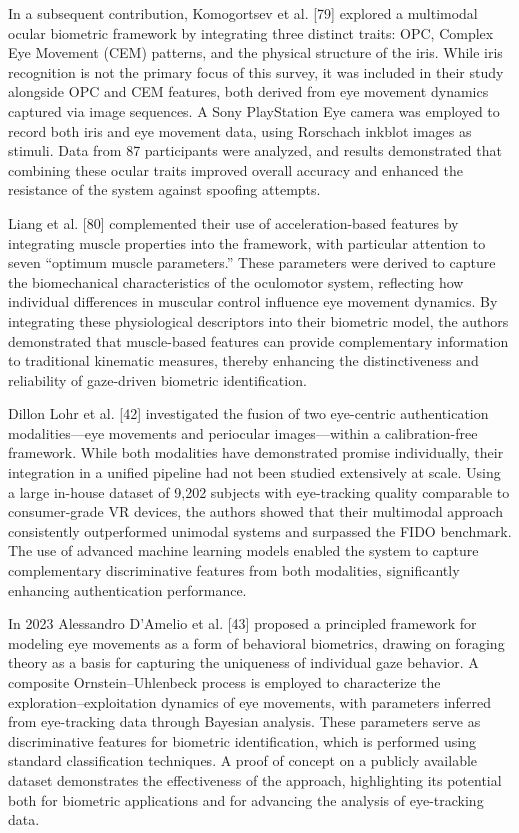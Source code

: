 \documentclass{article}
\begin{document}
In a subsequent contribution, Komogortsev et al. [79] explored a multimodal ocular biometric framework by integrating three distinct traits: OPC, Complex Eye Movement (CEM) patterns, and the physical structure of the iris.
While iris recognition is not the primary focus of this survey, it was included in their study alongside OPC and CEM features, both derived from eye movement dynamics captured via image sequences. 
A Sony PlayStation Eye camera was employed to record both iris and eye movement data, using Rorschach inkblot images as stimuli.
Data from 87 participants were analyzed, and results demonstrated that combining these ocular traits improved overall accuracy and enhanced the resistance of the system against spoofing attempts.

Liang et al. [80] complemented their use of acceleration-based features by integrating muscle properties into the framework, with particular attention to seven “optimum muscle parameters.”
These parameters were derived to capture the biomechanical characteristics of the oculomotor system, reflecting how individual differences in muscular control influence eye movement dynamics.
By integrating these physiological descriptors into their biometric model, the authors demonstrated that muscle-based features can provide complementary information to traditional kinematic measures, thereby enhancing the distinctiveness and reliability of gaze-driven biometric identification.

Dillon Lohr et al. [42] investigated the fusion of two eye-centric authentication modalities—eye movements and periocular images—within a calibration-free framework. 
While both modalities have demonstrated promise individually, their integration in a unified pipeline had not been studied extensively at scale.
Using a large in-house dataset of 9,202 subjects with eye-tracking quality comparable to consumer-grade VR devices, the authors showed that their multimodal approach consistently outperformed unimodal systems and surpassed the FIDO benchmark.
The use of advanced machine learning models enabled the system to capture complementary discriminative features from both modalities, significantly enhancing authentication performance.

In 2023 Alessandro D'Amelio et al. [43] proposed a principled framework for modeling eye movements as a form of behavioral biometrics, drawing on foraging theory as a basis for capturing the uniqueness of individual gaze behavior. 
A composite Ornstein–Uhlenbeck process is employed to characterize the exploration–exploitation dynamics of eye movements, with parameters inferred from eye-tracking data through Bayesian analysis.
These parameters serve as discriminative features for biometric identification, which is performed using standard classification techniques.
A proof of concept on a publicly available dataset demonstrates the effectiveness of the approach, highlighting its potential both for biometric applications and for advancing the analysis of eye-tracking data.
\end{document}
